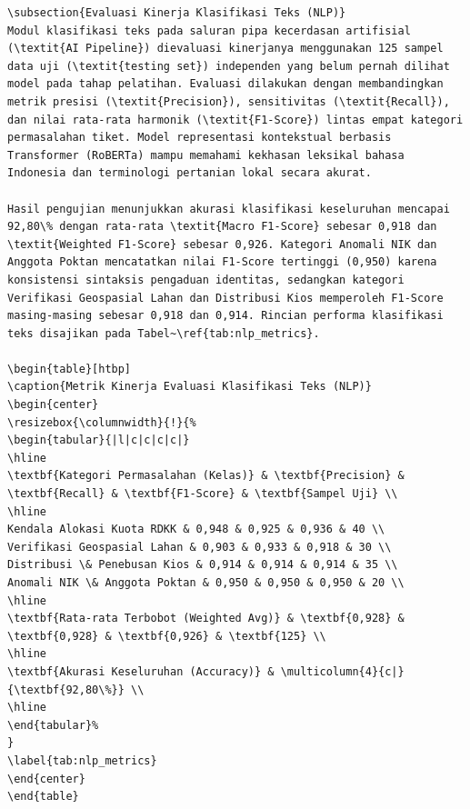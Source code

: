 \documentclass[conference]{IEEEtran}
\begin{document}
\begin{lstlisting}
\subsection{Evaluasi Kinerja Klasifikasi Teks (NLP)}
Modul klasifikasi teks pada saluran pipa kecerdasan artifisial (\textit{AI Pipeline}) dievaluasi kinerjanya menggunakan 125 sampel data uji (\textit{testing set}) independen yang belum pernah dilihat model pada tahap pelatihan. Evaluasi dilakukan dengan membandingkan metrik presisi (\textit{Precision}), sensitivitas (\textit{Recall}), dan nilai rata-rata harmonik (\textit{F1-Score}) lintas empat kategori permasalahan tiket. Model representasi kontekstual berbasis Transformer (RoBERTa) mampu memahami kekhasan leksikal bahasa Indonesia dan terminologi pertanian lokal secara akurat.

Hasil pengujian menunjukkan akurasi klasifikasi keseluruhan mencapai 92,80\% dengan rata-rata \textit{Macro F1-Score} sebesar 0,918 dan \textit{Weighted F1-Score} sebesar 0,926. Kategori Anomali NIK dan Anggota Poktan mencatatkan nilai F1-Score tertinggi (0,950) karena konsistensi sintaksis pengaduan identitas, sedangkan kategori Verifikasi Geospasial Lahan dan Distribusi Kios memperoleh F1-Score masing-masing sebesar 0,918 dan 0,914. Rincian performa klasifikasi teks disajikan pada Tabel~\ref{tab:nlp_metrics}.

\begin{table}[htbp]
\caption{Metrik Kinerja Evaluasi Klasifikasi Teks (NLP)}
\begin{center}
\resizebox{\columnwidth}{!}{%
\begin{tabular}{|l|c|c|c|c|}
\hline
\textbf{Kategori Permasalahan (Kelas)} & \textbf{Precision} & \textbf{Recall} & \textbf{F1-Score} & \textbf{Sampel Uji} \\
\hline
Kendala Alokasi Kuota RDKK & 0,948 & 0,925 & 0,936 & 40 \\
Verifikasi Geospasial Lahan & 0,903 & 0,933 & 0,918 & 30 \\
Distribusi \& Penebusan Kios & 0,914 & 0,914 & 0,914 & 35 \\
Anomali NIK \& Anggota Poktan & 0,950 & 0,950 & 0,950 & 20 \\
\hline
\textbf{Rata-rata Terbobot (Weighted Avg)} & \textbf{0,928} & \textbf{0,928} & \textbf{0,926} & \textbf{125} \\
\hline
\textbf{Akurasi Keseluruhan (Accuracy)} & \multicolumn{4}{c|}{\textbf{92,80\%}} \\
\hline
\end{tabular}%
}
\label{tab:nlp_metrics}
\end{center}
\end{table}


\end{lstlisting}
\end{document}
